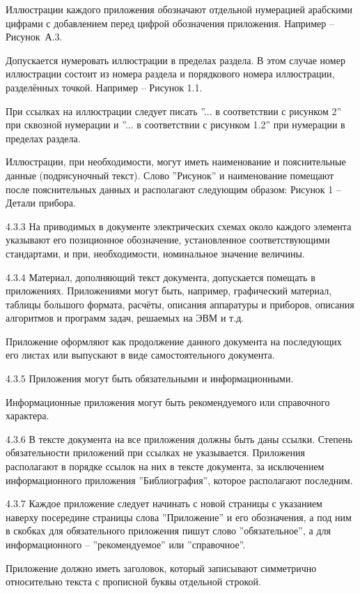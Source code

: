 Иллюстрации каждого приложения обозначают отдельной нумерацией арабскими цифрами с добавлением перед цифрой обозначения приложения. Например – Рисунок~А.3.

Допускается нумеровать иллюстрации в пределах раздела. В этом случае номер иллюстрации состоит из номера раздела и порядкового номера иллюстрации, разделённых точкой. Например – Рисунок 1.1.

При ссылках на иллюстрации следует писать ''... в соответствии с рисунком 2'' при сквозной нумерации и ''... в соответствии с рисунком 1.2'' при нумерации в пределах раздела.

Иллюстрации, при необходимости, могут иметь наименование и пояснительные данные (подрисуночный текст). Слово ''Рисунок'' и наименование помещают после пояснительных данных и располагают следующим образом: Рисунок 1 – Детали прибора.

4.3.3 На приводимых в документе электрических схемах около каждого элемента указывают его позиционное обозначение, установленное соответствующими стандартами, и при, необходимости, номинальное значение величины.

4.3.4 Материал, дополняющий текст документа, допускается помещать в приложениях. Приложениями могут быть, например, графический материал, таблицы большого формата, расчёты, описания аппаратуры и приборов, описания алгоритмов и программ задач, решаемых на ЭВМ и т.д.

Приложение оформляют как продолжение данного документа на последующих его листах или выпускают в виде самостоятельного документа.

4.3.5 Приложения могут быть обязательными и информационными.

Информационные приложения могут быть рекомендуемого или справочного характера.

4.3.6 В тексте документа на все приложения должны быть даны ссылки. Степень обязательности приложений при ссылках не указывается. Приложения располагают в порядке ссылок на них в тексте документа, за исключением информационного приложения ''Библиография'', которое располагают последним.

4.3.7 Каждое приложение следует начинать с новой страницы с указанием наверху посередине страницы слова ''Приложение'' и его обозначения, а под ним в скобках для обязательного приложения пишут слово ''обязательное'', а для информационного – ''рекомендуемое'' или ''справочное''.

Приложение должно иметь заголовок, который записывают симметрично относительно текста с прописной буквы отдельной строкой.

